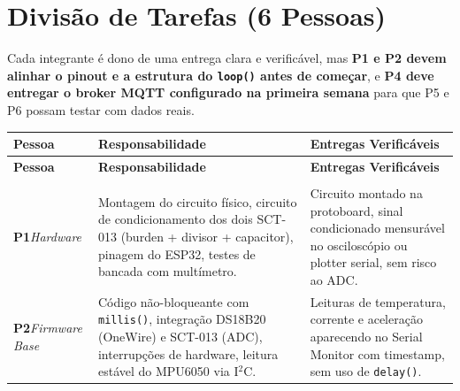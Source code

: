 \documentclass[12pt, a4paper]{article}
\begin{document}
\section{Divisão de Tarefas (6 Pessoas)}

\begin{tcolorbox}[caixaInfo, title={Critério de Divisão}]
Cada integrante é dono de uma entrega clara e verificável, mas \textbf{P1 e P2 devem alinhar o pinout e a estrutura do \texttt{loop()} antes de começar}, e \textbf{P4 deve entregar o broker MQTT configurado na primeira semana} para que P5 e P6 possam testar com dados reais.
\end{tcolorbox}

\setlength{\tabcolsep}{5pt}
\renewcommand{\arraystretch}{1.45}
\begin{longtable}{>{\centering\arraybackslash}p{2.4cm} >{\raggedright\arraybackslash}p{5.8cm} >{\raggedright\arraybackslash}p{5.8cm}}

\toprule
\textbf{Pessoa} & \textbf{Responsabilidade} & \textbf{Entregas Verificáveis} \\
\midrule
\endfirsthead

\toprule
\textbf{Pessoa} & \textbf{Responsabilidade} & \textbf{Entregas Verificáveis} \\
\midrule
\endhead

\midrule
\multicolumn{3}{r}{\footnotesize\textit{(continua na próxima página)}} \\
\endfoot

\bottomrule
\endlastfoot

\textbf{P1}\newline\textit{Hardware} &
    Montagem do circuito físico, circuito de condicionamento dos dois SCT-013
    (burden + divisor + capacitor), pinagem do ESP32, testes de bancada com multímetro. &
    Circuito montado na protoboard, sinal condicionado mensurável no
    osciloscópio ou plotter serial, sem risco ao ADC. \\
\midrule

\textbf{P2}\newline\textit{Firmware Base} &
    Código não-bloqueante com \texttt{millis()}, integração DS18B20 (OneWire) e
    SCT-013 (ADC), interrupções de hardware, leitura estável do MPU6050 via I$^2$C. &
    Leituras de temperatura, corrente e aceleração aparecendo no Serial Monitor
    com timestamp, sem uso de \texttt{delay()}. \\
\midrule


\end{longtable}
\end{document}
